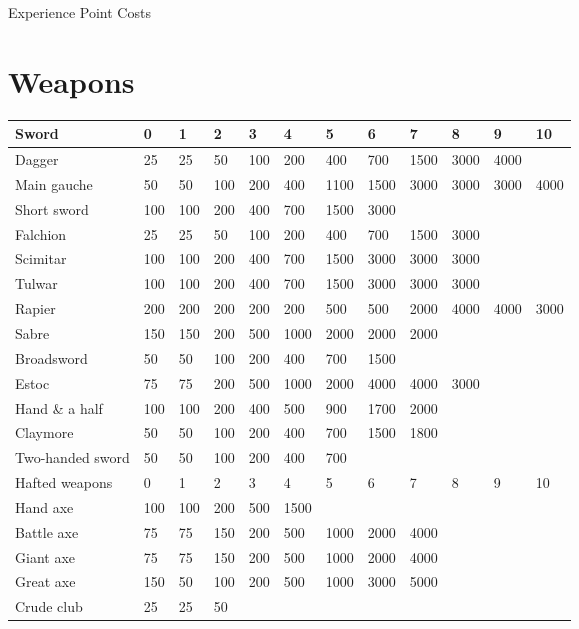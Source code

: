 \begin{Table}{Experience Point Costs}

\section{Weapons}

\begin{tabularx}{\linewidth}{Xlllllllllll} \hline
Sword			& 0	& 1	& 2	& 3	& 4	& 5	& 6	& 7	& 8	& 9	& 10	\\ \hline
Dagger			& 25	& 25	& 50	& 100	& 200	& 400	& 700	& 1500	& 3000	& 4000	& 	\\
Main gauche		& 50	& 50 	& 100	& 200	& 400	& 1100	& 1500	& 3000	& 3000	& 3000	& 4000	\\
Short sword		& 100	& 100 	& 200	& 400	& 700	& 1500	& 3000	& 	& 	& 	&  \\
Falchion		& 25	& 25 	& 50	& 100	& 200	& 400	& 700	& 1500	& 3000	& 	&  \\
Scimitar		& 100	& 100 	& 200	& 400	& 700	& 1500	& 3000	& 3000	& 3000	& 	&  \\
Tulwar			& 100	& 100 	& 200	& 400	& 700	& 1500	& 3000	& 3000	& 3000	& 	&  \\
Rapier			& 200	& 200 	& 200	& 200	& 200	& 500	& 500	& 2000	& 4000	& 4000	& 3000 \\
Sabre			& 150	& 150 	& 200	& 500	& 1000	& 2000	& 2000	& 2000	& 	& 	&  \\
Broadsword		& 50	& 50 	& 100	& 200	& 400	& 700	& 1500	& 	& 	& 	&  \\
Estoc			& 75	& 75 	& 200	& 500	& 1000	& 2000	& 4000	& 4000	& 3000	& 	&  \\
Hand \& a half		& 100	& 100 	& 200	& 400	& 500	& 900	& 1700	& 2000	& 	& 	&  \\
Claymore		& 50	& 50 	& 100	& 200	& 400	& 700	& 1500	& 1800	& 	& 	&  \\
Two-handed sword	& 50	& 50 	& 100	& 200	& 400	& 700	& 	& 	& 	& 	&  \\ \hline
Hafted weapons		& 0	& 1 	& 2	& 3	& 4	& 5	& 6	& 7	& 8	& 9	& 10 \\ \hline
Hand axe		& 100	& 100 	& 200	& 500	& 1500	& 	& 	& 	& 	& 	&  \\
Battle axe		& 75	& 75 	& 150	& 200	& 500	& 1000	& 2000	& 4000	& 	& 	&  \\
Giant axe		& 75	& 75 	& 150	& 200	& 500	& 1000	& 2000	& 4000	& 	& 	&  \\
Great axe		& 150	& 50 	& 100	& 200	& 500	& 1000	& 3000	& 5000	& 	& 	&  \\
Crude club		& 25	& 25 	& 50	& 	& 	& 	& 	& 	& 	& 	&  \\

\end{tabularx}
\end{Table}
